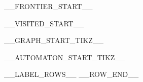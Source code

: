 \noindent\begin{minipage}[t]{0.24\textwidth}
\begingroup
\setlength{\textwidth}{\linewidth}
\begin{center}
__FRONTIER_START__
\end{center}
\endgroup
\end{minipage}\hfill%
\noindent\begin{minipage}[t]{0.24\textwidth}
\begingroup
\setlength{\textwidth}{\linewidth}
\begin{center}
__VISITED_START__
\end{center}
\endgroup
\end{minipage}\hfill%
\noindent\begin{minipage}[t]{0.24\textwidth}
__GRAPH_START_TIKZ__
\end{minipage}\hfill%
\noindent\begin{minipage}[t]{0.24\textwidth}
__AUTOMATON_START_TIKZ__
\end{minipage}

__LABEL_ROWS__
__ROW_END__
